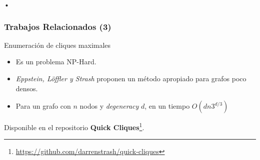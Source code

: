\begin{frame}{•}
\frametitle{Trabajos Relacionados (3)}

Enumeración de cliques maximales

\begin{itemize}
	\item Es un problema NP-Hard.
	\item \textit{Eppstein, Löffler y Strash} proponen un método apropiado para grafos poco densos.
	\item Para un grafo con $n$ nodos y \textit{degeneracy} $d$, en un tiempo $O(dn3^{d/3})$
\end{itemize}

Disponible en el repositorio \textbf{Quick Cliques}\footnote{\url{https://github.com/darrenstrash/quick-cliques}}.


\end{frame}